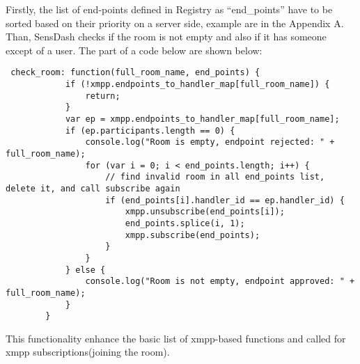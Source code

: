 Firstly, the list of end-points defined in Registry as ``end\_points'' have to be sorted based on their priority on a server side, example are in the Appendix A. Than, SensDash checks if the room is not empty and also if it has someone except of a user. The part of a code below are shown below:
\begin{lstlisting}
 check_room: function(full_room_name, end_points) {
            if (!xmpp.endpoints_to_handler_map[full_room_name]) {
                return;
            }
            var ep = xmpp.endpoints_to_handler_map[full_room_name];
            if (ep.participants.length == 0) {
                console.log("Room is empty, endpoint rejected: " + full_room_name);
                for (var i = 0; i < end_points.length; i++) {
                    // find invalid room in all end_points list, delete it, and call subscribe again
                    if (end_points[i].handler_id == ep.handler_id) {
                        xmpp.unsubscribe(end_points[i]);
                        end_points.splice(i, 1);
                        xmpp.subscribe(end_points);
                    }
                }
            } else {
                console.log("Room is not empty, endpoint approved: " + full_room_name);
            }
        }
\end{lstlisting}
This functionality enhance the basic list of xmpp-based functions and called for xmpp subscriptions(joining the room).

